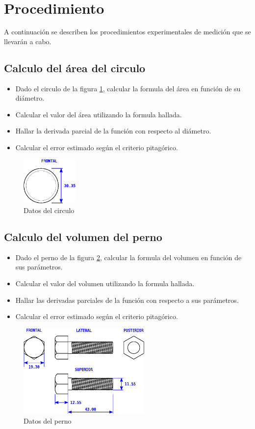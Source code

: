 \documentclass[letter,11pt]{article}
\begin{document}
\section{Procedimiento}
A continuación se describen los procedimientos experimentales de medición que se
llevarán a cabo.

\subsection{Calculo del área del circulo}
\begin{itemize}
\item Dado el circulo de la figura \ref{circulo}, calcular la formula del
área en función de su diámetro.
\item Calcular el valor del área utilizando la formula hallada.
\item Hallar la derivada parcial de la función con respecto al diámetro.
\item Calcular el error estimado según el criterio pitagórico.
\end{itemize}

\begin{figure}
\centering
\includegraphics[width=0.25\textwidth]{eps/2.1.circulo.eps}
\caption{Datos del circulo}
\label{circulo}
\end{figure}

\subsection{Calculo del volumen del perno}
\begin{itemize}
\item Dado el perno de la figura \ref{perno}, calcular la formula del
volumen en función de sus parámetros.
\item Calcular el valor del volumen utilizando la formula hallada.
\item Hallar las derivadas parciales de la función con respecto a sus
parámetros.
\item Calcular el error estimado según el criterio pitagórico.
\end{itemize}

\begin{figure}
\centering
\includegraphics[width=0.58\textwidth]{eps/2.2.perno.eps}
\caption{Datos del perno}
\label{perno}
\end{figure}
\end{document}
